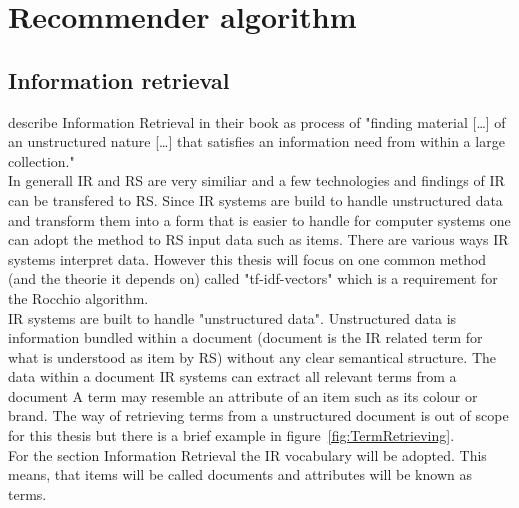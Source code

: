 
\section{Recommender algorithm}


\subsection{Information retrieval}
\iffalse
Was ist Information retrieval
in depth implementation is out of scope
Hinleitung zu Vektoren
\fi
\citeauthor{manning:2009} describe Information Retrieval in their book as process of "finding material [\dots] of an unstructured nature [\dots] that satisfies an information need from within a large collection."\citep[p.~1]{manning:2009}\\
In generall IR and RS are very similiar and a few technologies and findings of IR can be transfered to RS.
Since IR systems are build to handle unstructured data and transform them into a form that is easier to handle for computer systems one can adopt the method to RS input data such as items.\citep[p.~21-23]{ricci:2011}
There are various ways IR systems interpret data.
However this thesis will focus on one common method (and the theorie it depends on) called "tf-idf-vectors" which is a requirement for the Rocchio algorithm.\citep[p.~93]{lops:2011}\\
IR systems are built to handle "unstructured data".
Unstructured data is information bundled within a document (document is the IR related term for what is understood as item by RS) without any clear semantical structure.\citep[p.~1-3]{manning:2009}
The data within a document
IR systems can extract all relevant terms from a document
A term may resemble an attribute of an item such as its colour or brand.
The way of retrieving terms from a unstructured document is out of scope for this thesis but there is a brief example in figure~\ref{fig:TermRetrieving}.\\
For the section Information Retrieval the IR vocabulary will be adopted.
This means, that items will be called documents and attributes will be known as terms.

